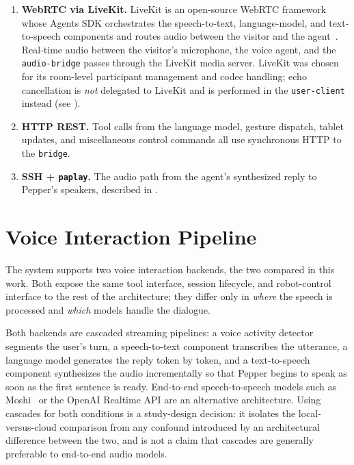 \begin{enumerate}
    \item \textbf{WebRTC via LiveKit.}
    LiveKit is an open-source WebRTC framework whose Agents SDK orchestrates the speech-to-text, language-model, and text-to-speech components and routes audio between the visitor and the agent~\cite{livekit_docs}.
    Real-time audio between the visitor's microphone, the voice agent, and the \texttt{audio-bridge} passes through the LiveKit media server.
    LiveKit was chosen for its room-level participant management and codec handling; echo cancellation is \emph{not} delegated to LiveKit and is performed in the \texttt{user-client} instead (see ).

    \item \textbf{HTTP REST.}
    Tool calls from the language model, gesture dispatch, tablet updates, and miscellaneous control commands all use synchronous HTTP to the \texttt{bridge}.

    \item \textbf{SSH + \texttt{paplay}.}
    The audio path from the agent's synthesized reply to Pepper's speakers, described in .
\end{enumerate}



\section{Voice Interaction Pipeline}
\label{sec:voice_pipeline}

The system supports two voice interaction backends, the two compared in this work.
Both expose the same tool interface, session lifecycle, and robot-control interface to the rest of the architecture; they differ only in \emph{where} the speech is processed and \emph{which} models handle the dialogue.

Both backends are cascaded streaming pipelines: a voice activity detector segments the user's turn, a speech-to-text component transcribes the utterance, a language model generates the reply token by token, and a text-to-speech component synthesizes the audio incrementally so that Pepper begins to speak as soon as the first sentence is ready.
End-to-end speech-to-speech models such as Moshi~\cite{defossez2024moshi} or the OpenAI Realtime API are an alternative architecture.
Using cascades for both conditions is a study-design decision: it isolates the local-versus-cloud comparison from any confound introduced by an architectural difference between the two, and is not a claim that cascades are generally preferable to end-to-end audio models.

